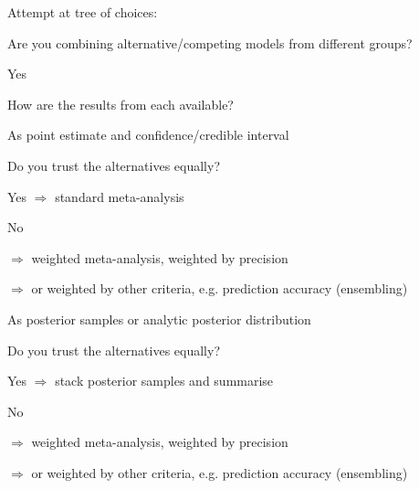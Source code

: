 \documentclass{article}
\begin{document}
Attempt at tree of choices:
\begin{tree}
    \item Are you combining alternative/competing models from different groups?
    \begin{tree}
        \item Yes
        \begin{tree}
            \item How are the results from each available?
            \begin{tree}
                \item As point estimate and confidence/credible interval
                \begin{tree}
                    \item Do you trust the alternatives equally?
                    \begin{tree}
                        \item Yes $\Rightarrow$ standard meta-analysis
                        \item No
                        \begin{tree}
                            \item $\Rightarrow$ weighted meta-analysis, weighted by precision
                            \item $\Rightarrow$ or weighted by other criteria, e.g. prediction accuracy (ensembling)
                        \end{tree}
                    \end{tree}
                \end{tree}
                \item As posterior samples or analytic posterior distribution
                \begin{tree}
                    \item Do you trust the alternatives equally?
                    \begin{tree}
                        \item Yes $\Rightarrow$ stack posterior samples and summarise
                        \item No
                        \begin{tree}
                            \item $\Rightarrow$ weighted meta-analysis, weighted by precision
                            \item $\Rightarrow$ or weighted by other criteria, e.g. prediction accuracy (ensembling)
                        \end{tree}

\end{tree}
\end{tree}
\end{tree}
\end{tree}
\end{tree}
\end{tree}
\end{document}
